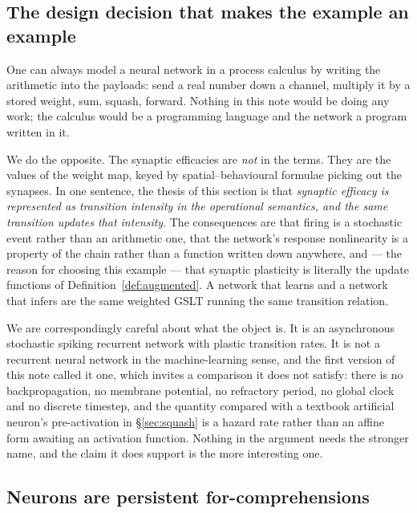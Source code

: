 \documentclass[11pt,a4paper]{article}
\theoremstyle{plain}
\theoremstyle{definition}
\theoremstyle{remark}
\begin{document}
\subsection{The design decision that makes the example an example}

One can always model a neural network in a process calculus by writing the arithmetic into the
payloads: send a real number down a channel, multiply it by a stored weight, sum, squash, forward.
Nothing in this note would be doing any work; the calculus would be a programming language and the
network a program written in it.

We do the opposite. The synaptic efficacies are \emph{not} in the terms. They are the values of the
weight map, keyed by spatial--behavioural formulae picking out the synapses. In one sentence, the
thesis of this section is that \emph{synaptic efficacy is represented as transition intensity in the
operational semantics, and the same transition updates that intensity}. The consequences are that
firing is a stochastic event rather than an arithmetic one, that the network's response nonlinearity
is a property of the chain rather than a function written down anywhere, and --- the reason for
choosing this example --- that synaptic plasticity is literally the update functions of
Definition~\ref{def:augmented}. A network that learns and a network that infers are the same weighted
GSLT running the same transition relation.

We are correspondingly careful about what the object is. It is an asynchronous stochastic spiking
recurrent network with plastic transition rates. It is not a recurrent neural network in the
machine-learning sense, and the first version of this note called it one, which invites a comparison
it does not satisfy: there is no backpropagation, no membrane potential, no refractory period, no
global clock and no discrete timestep, and the quantity compared with a textbook artificial neuron's
pre-activation in \S\ref{sec:squash} is a hazard rate rather than an affine form awaiting an
activation function. Nothing in the argument needs the stronger name, and the claim it does support
is the more interesting one.

\subsection{Neurons are persistent for-comprehensions}
\end{document}
